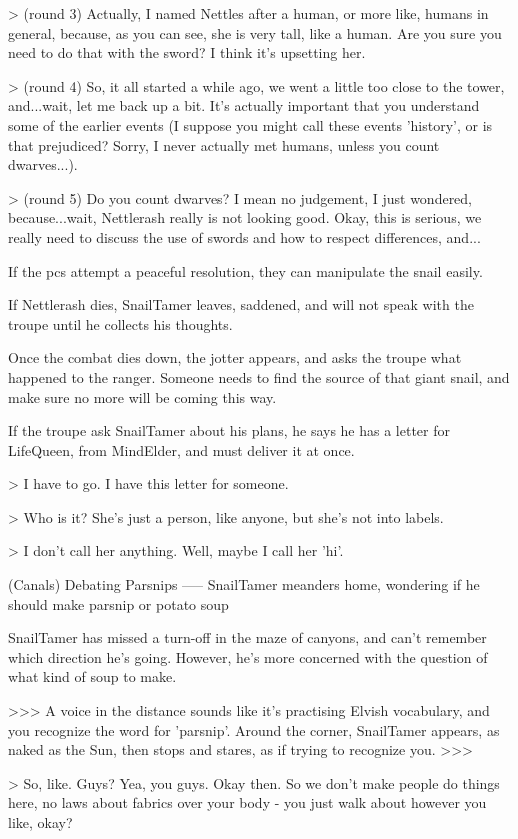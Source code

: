 > (round 3) Actually, I named Nettles after a human, or more like, humans in general, because, as you can see, she is very tall, like a human.  Are you sure you need to do that with the sword?  I think it's upsetting her.

> (round 4) So, it all started a while ago, we went a little too close to the tower, and...wait, let me back up a bit.  It's actually important that you understand some of the earlier events (I suppose you might call these events 'history', or is that prejudiced?  Sorry, I never actually met humans, unless you count dwarves...).

> (round 5) Do you count dwarves?  I mean no judgement, I just wondered, because...wait, Nettlerash really is not looking good.  Okay, this is serious, we really need to discuss the use of swords and how to respect differences, and...

If the \glspl{pc} attempt a peaceful resolution,
they can manipulate the snail easily.

If Nettlerash dies,
SnailTamer leaves, saddened, and will not speak with the troupe until he collects his thoughts.

Once the combat dies down,
the \gls{jotter} appears, and asks the troupe what happened to the ranger.
Someone needs to find the source of that giant snail, and make sure no more will be coming this way.

If the troupe ask SnailTamer about his plans,
he says he has a letter for LifeQueen, from MindElder, and must deliver it at once.

> I have to go.  I have this letter for someone.

> Who is it?  She's just a person, like anyone, but she's not into labels.

> I don't call her anything.  Well, maybe I call her 'hi'.

(Canals) Debating Parsnips
-----
{SnailTamer meanders home, wondering if he should make parsnip or potato soup}

SnailTamer has missed a turn-off in the maze of canyons, and can't remember which direction he's going.
However, he's more concerned with the question of what kind of soup to make.

>>>
A voice in the distance sounds like it's practising Elvish vocabulary, and you recognize the word for 'parsnip'.
Around the corner, SnailTamer appears, as naked as the Sun, then stops and stares, as if trying to recognize you.
>>>

> So, like.  Guys?  Yea, you guys.  Okay then.  So we don't make people do things here, no laws about fabrics over your body - you just walk about however you like, okay?

